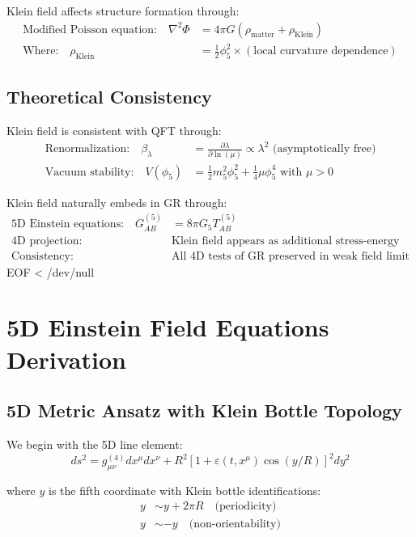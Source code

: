 \documentclass[12pt]{iopart}
\begin{document}
Klein field affects structure formation through:
\begin{align}
\text{Modified Poisson equation:} \quad \nabla^2\Phi &= 4\pi G(\rho_{\text{matter}} + \rho_{\text{Klein}})\\
\text{Where:} \quad \rho_{\text{Klein}} &= \frac{1}{2}\phi_5^2 \times (\text{local curvature dependence})
\end{align}

\subsection{Theoretical Consistency}

Klein field is consistent with QFT through:
\begin{align}
\text{Renormalization:} \quad \beta_\lambda &= \frac{\partial\lambda}{\partial\ln(\mu)} \propto \lambda^2 \text{ (asymptotically free)}\\
\text{Vacuum stability:} \quad V(\phi_5) &= \frac{1}{2}m_5^2\phi_5^2 + \frac{1}{4}\mu\phi_5^4 \text{ with } \mu > 0
\end{align}

Klein field naturally embeds in GR through:
\begin{align}
\text{5D Einstein equations:} \quad G_{AB}^{(5)} &= 8\pi G_5 T_{AB}^{(5)}\\
\text{4D projection:} \quad &\text{Klein field appears as additional stress-energy}\\
\text{Consistency:} \quad &\text{All 4D tests of GR preserved in weak field limit}
\end{align}
EOF < /dev/null


\section{5D Einstein Field Equations Derivation}
\label{app:5d_einstein}

\subsection{5D Metric Ansatz with Klein Bottle Topology}

We begin with the 5D line element:
\begin{equation}
ds^2 = g_{\mu\nu}^{(4)}dx^\mu dx^\nu + R^2[1 + \varepsilon(t,x^\mu)\cos(y/R)]^2 dy^2
\end{equation}

where $y$ is the fifth coordinate with Klein bottle identifications:
\begin{align}
y &\sim y + 2\pi R \quad \text{(periodicity)}\\
y &\sim -y \quad \text{(non-orientability)}
\end{align}
\end{document}
